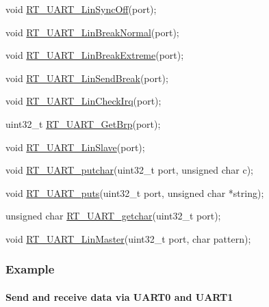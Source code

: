 \begin{DoxyCode}
\textcolor{keywordtype}{void} \mbox{\hyperlink{a00173_aea01869278bc3c4e332af854c4e660be}{RT\_UART\_LinSyncOff}}(port);

\textcolor{keywordtype}{void} \mbox{\hyperlink{a00173_a45d1e1116c5b535f276acc73e522570f}{RT\_UART\_LinBreakNormal}}(port);

\textcolor{keywordtype}{void} \mbox{\hyperlink{a00173_a9e7d98206f07485a3347bab6672a971c}{RT\_UART\_LinBreakExtreme}}(port);

\textcolor{keywordtype}{void} \mbox{\hyperlink{a00173_ad1e6c13693e5ea54a55ce78635617178}{RT\_UART\_LinSendBreak}}(port);

\textcolor{keywordtype}{void} \mbox{\hyperlink{a00173_a2e2715198f9716282584f34a7f472649}{RT\_UART\_LinCheckIrq}}(port);

uint32\_t \mbox{\hyperlink{a00173_a74f1bca1f0b60eeec1f84bcba3e34919}{RT\_UART\_GetBrp}}(port);

\textcolor{keywordtype}{void} \mbox{\hyperlink{a00173_a3f9518fa74ec401803fe1d15e0d39ff2}{RT\_UART\_LinSlave}}(port);

\textcolor{keywordtype}{void} \mbox{\hyperlink{a00170_ab03e9e1a8d4d9b97583db27174086108}{RT\_UART\_putchar}}(uint32\_t port, \textcolor{keywordtype}{unsigned} \textcolor{keywordtype}{char} c);

\textcolor{keywordtype}{void} \mbox{\hyperlink{a00170_ad61c03a00ccd43875563c16f97d61af7}{RT\_UART\_puts}}(uint32\_t port, \textcolor{keywordtype}{unsigned} \textcolor{keywordtype}{char} *\textcolor{keywordtype}{string});

\textcolor{keywordtype}{unsigned} \textcolor{keywordtype}{char} \mbox{\hyperlink{a00170_abc136df9d66fe27bf8ffcc319246591e}{RT\_UART\_getchar}}(uint32\_t port);

\textcolor{keywordtype}{void} \mbox{\hyperlink{a00170_ab0faf051e642e540b1b9c114eae242bd}{RT\_UART\_LinMaster}}(uint32\_t port, \textcolor{keywordtype}{char} pattern);
\end{DoxyCode}


\subsubsection*{Example}

\paragraph*{Send and receive data via U\+A\+R\+T0 and U\+A\+R\+T1}


